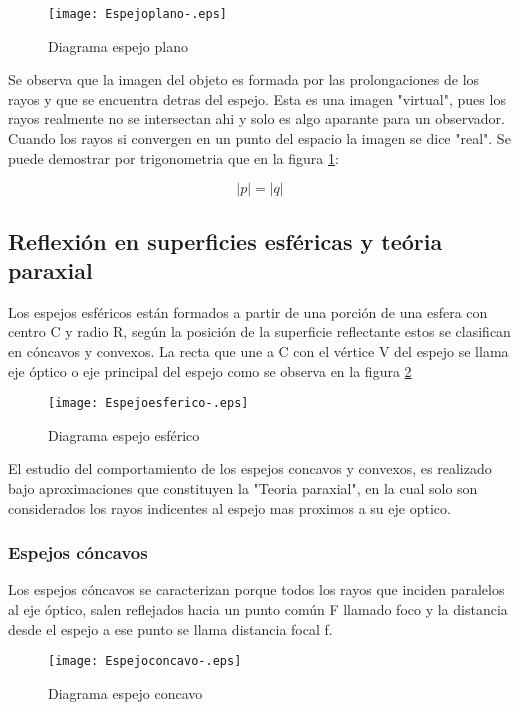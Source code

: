\documentclass[a4paper,12pt]{article}
\begin{document}
\begin{figure}[h]
    \centering  
    \texttt{[image: Espejoplano-.eps]}
    \caption{Diagrama espejo plano}
    \label{fig:Espejo plano}
\end{figure}

Se observa que la imagen del objeto es formada por las prolongaciones de los rayos y que se encuentra detras del espejo. Esta es una imagen "virtual", pues los rayos realmente no se intersectan ahi y solo es algo aparante para un observador. Cuando los rayos si convergen en un punto del espacio la imagen se dice "real". Se puede demostrar por trigonometria que en la figura \ref{fig:Espejo plano}:

\begin{equation}
    |p| = |q|
\end{equation}


\subsection*{Reflexión en superficies esféricas y teória paraxial}
Los espejos esféricos están formados a partir de una porción de una esfera con centro C y radio R, según la posición de la superficie reflectante estos se clasifican en cóncavos y convexos. La recta que une a C con el vértice V del espejo se llama eje óptico o eje principal del espejo como se observa en la figura \ref{fig:Espejo esferico}

\begin{figure}[h]
    \centering  
    \texttt{[image: Espejoesferico-.eps]}
    \caption{Diagrama espejo esférico}
    \label{fig:Espejo esferico}
\end{figure}

El estudio del comportamiento de los espejos concavos y convexos, es realizado bajo aproximaciones que constituyen la "Teoria paraxial", en la cual solo son considerados los rayos indicentes al espejo mas proximos a su eje optico.
\subsubsection*{Espejos cóncavos}
Los espejos cóncavos se caracterizan porque todos los rayos que inciden paralelos al eje óptico, salen reflejados hacia un punto común F llamado foco y la distancia desde el espejo a ese punto se llama distancia focal f.

\begin{figure}[h]
    \centering  
    \texttt{[image: Espejoconcavo-.eps]}
    \caption{Diagrama espejo concavo}
    \label{fig:Espejo concavo}
\end{figure}
\end{document}
